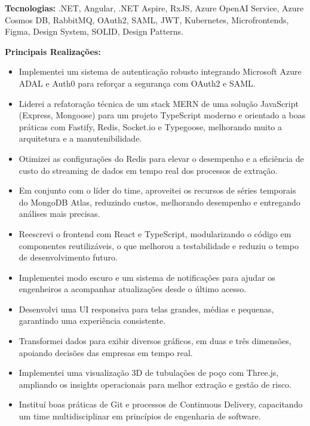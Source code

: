 \documentclass[10pt,a4paper]{altacv}
\begin{document}
\textbf{Tecnologias:} .NET, Angular, .NET Aspire, RxJS, Azure OpenAI Service, Azure Cosmos DB, RabbitMQ, OAuth2, SAML, JWT, Kubernetes, Microfrontends, Figma, Design System, SOLID, Design Patterns.


\break
\newpage
{}


\textbf{Principais Realizações:}
\begin{itemize}
\setlength{\itemindent}{0.5em}
\item[--] Implementei um sistema de autenticação robusto integrando Microsoft Azure ADAL e Auth0 para reforçar a segurança com OAuth2 e SAML.
\item[--] Liderei a refatoração técnica de um stack MERN de uma solução JavaScript (Express, Mongoose) para um projeto TypeScript moderno e orientado a boas práticas com Fastify, Redis, Socket.io e Typegoose, melhorando muito a arquitetura e a manutenibilidade.
\item[--] Otimizei as configurações do Redis para elevar o desempenho e a eficiência de custo do streaming de dados em tempo real dos processos de extração.
\item[--] Em conjunto com o líder do time, aproveitei os recursos de séries temporais do MongoDB Atlas, reduzindo custos, melhorando desempenho e entregando análises mais precisas.
\item[--] Reescrevi o frontend com React e TypeScript, modularizando o código em componentes reutilizáveis, o que melhorou a testabilidade e reduziu o tempo de desenvolvimento futuro.
\item[--] Implementei modo escuro e um sistema de notificações para ajudar os engenheiros a acompanhar atualizações desde o último acesso.
\item[--] Desenvolvi uma UI responsiva para telas grandes, médias e pequenas, garantindo uma experiência consistente.
\item[--] Transformei dados para exibir diversos gráficos, em duas e três dimensões, apoiando decisões das empresas em tempo real.
\item[--] Implementei uma visualização 3D de tubulações de poço com Three.js, ampliando os insights operacionais para melhor extração e gestão de risco.
\item[--] Instituí boas práticas de Git e processos de Continuous Delivery, capacitando um time multidisciplinar em princípios de engenharia de software.
\end{itemize}
\end{document}
